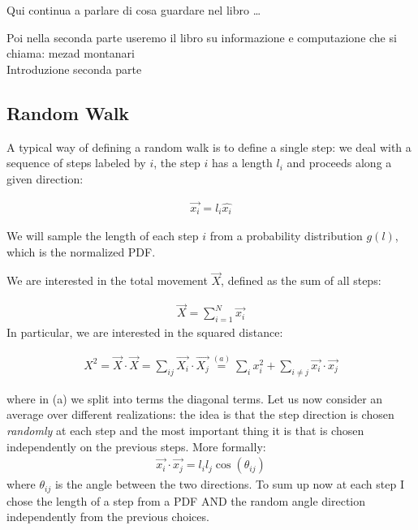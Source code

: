 \documentclass[\main/main.tex]{subfiles}
\begin{document}
Qui continua a parlare di cosa guardare nel libro \dots

Poi nella seconda parte useremo il libro su informazione e computazione che si chiama: mezad montanari \\

Introduzione seconda parte


\subsection{Random Walk}
A typical way of defining a random walk is to define a single step: we deal with a sequence of steps labeled by $i$, the step $i$ has a length $l_i$ and proceeds along a given direction:

\begin{eqnarray}
\Vec{x_i}=l_i\hat{x_i}
\end{eqnarray}

We will sample the length of each step $i$ from a probability distribution $g(l)$, which is the normalized PDF. 

We are interested in the total movement $\Vec{X}$, defined as the sum of all steps:

\begin{eqnarray}
\Vec{X}=\sum_{i=1}^N\Vec{x_i}
\end{eqnarray}
In particular, we are interested in the squared distance:

\begin{eqnarray}
X^2=\Vec{X}\cdot\Vec{X}=\sum_{ij} \Vec{X_i}\cdot\Vec{X_j}\overset{(a)}{=}\sum_ix_i^2+\sum_{i\neq j}\Vec{x_i}\cdot\Vec{x_j}
\end{eqnarray}

where in (a) we split into terms the diagonal terms. Let us now consider an average over different realizations: the idea is that the step direction is chosen \textit{randomly} at each step and the most important thing it is that is chosen independently on the previous steps. More formally:
\begin{eqnarray}
\Vec{x_i}\cdot\Vec{x_j}=l_il_j\cos(\theta_{ij})
\end{eqnarray}
where $\theta_{ij}$ is the angle between the two directions. To sum up now at each step I chose the length of a step from a PDF AND the random angle direction independently from the previous choices. \\
\end{document}

